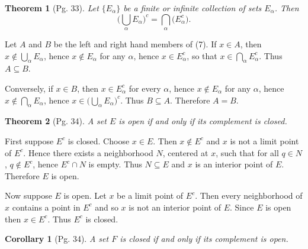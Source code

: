 \documentclass[leqno]{article}
\makeatletter
\newtheorem{theorem}{Theorem}[section]
\newtheorem{corollary}{Corollary}[theorem]
\theoremstyle{definition}
\theoremstyle{remark}
\let\oldproofname=\proofname
\renewcommand{\proofname}{\bf{\textit{\oldproofname}}}
\renewenvironment{proof}[1][\proofname]{\par
  \pushQED{\qed}%
  \normalfont \topsep6\p@\@plus6\p@\relax
  \list{}{\leftmargin=0mm
          \rightmargin=0mm
          \settowidth{\itemindent}{\itshape#1}%
          \labelwidth=4mm
          \parsep=0pt \listparindent=0mm%
  }
  \item[\hskip\labelsep
        \itshape
    #1\@addpunct{.}]\ignorespaces
}{%
  \popQED\endlist\@endpefalse
}
\makeatother
\begin{document}
            \begin{theorem}[Pg. 33]\label{thm:5.3}
                Let $\{E_{\alpha}\}$ be a \normalfont{(}finite or infinite\normalfont{)} collection of sets $E_{\alpha}$. Then 
                    \begin{equation}
                        \bigg(\bigcup_{\alpha}E_{\alpha}\bigg)^c=\bigcap_{\alpha}\big(E_{\alpha}^c\big).
                    \end{equation} 
            \end{theorem}
                \begin{proof}
                    Let $A$ and $B$ be the left and right hand members of (7). If $x\in A$, then $x\not\in\bigcup_{\alpha}E_{\alpha}$, hence $x\notin E_{\alpha}$ for any $\alpha$, hence $x\in E_{\alpha}^c$, so that $x\in\bigcap_{\alpha}E_{\alpha}^c$. Thus $A\subseteq B$.\par Conversely, if $x\in B$, then $x\in E_{\alpha}^c$ for every $\alpha$, hence $x\notin E_{\alpha}$ for any $\alpha$, hence $x\notin\bigcap_{\alpha}E_{\alpha}$, hence $x\in\big(\bigcup_{\alpha}E_{\alpha}\big)^c$. Thus $B\subseteq A$. Therefore $A=B$.
                \end{proof}\newpage
            \begin{theorem}[Pg. 34]\label{thm:5.4}
                A set $E$ is open if and only if its complement is closed. 
            \end{theorem}
                \begin{proof}
                    First suppose $E^c$ is closed. Choose $x\in E$. Then $x\notin E^c$ and $x$ is not a limit point of $E^c$. Hence there exists a neighborhood $N$, centered at $x$, such that for all $q\in N$,  $q\notin E^c$, hence $E^c\cap N$ is empty. Thus $N\subseteq E$ and $x$ is an interior point of $E$. Therefore $E$ is open.\par\hspace{4mm} Now suppose $E$ is open. Let $x$ be a limit point of $E^c$. Then every neighborhood of $x$ contains a point in $E^c$ and so $x$ is not an interior point of $E$. Since $E$ is open then $x\in E^c$. Thus $E^c$ is closed.
                \end{proof}
            \begin{corollary}[Pg. 34]\label{cor:5.4.1}
                A set $F$ is closed if and only if its complement is open.
            \end{corollary}
\end{document}
